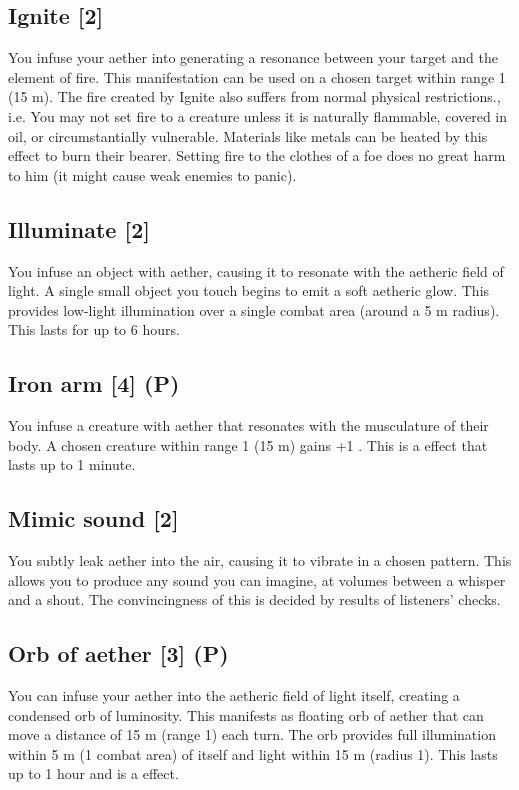 \subsection{Ignite [2]}
\label{spell:ignite}
You infuse your aether into generating a resonance between your target and the element of fire. This manifestation can be used on a chosen target within range 1 (15 m). The fire created by Ignite also suffers from normal physical restrictions., i.e. You may not set fire to a creature unless it is naturally flammable, covered in oil, or circumstantially vulnerable. Materials like metals can be heated by this effect to burn their bearer. Setting fire to the clothes of a foe does no great harm to him (it might cause weak enemies to panic).


\subsection{Illuminate [2]}
\label{spell:illuminate}
You infuse an object with aether, causing it to resonate with the aetheric field of light. A single small object you touch begins to emit a soft aetheric glow. This provides low-light illumination over a single combat area (around a 5 m radius). This lasts for up to 6 hours.


\subsection{Iron arm [4] (P)}
You infuse a creature with aether that resonates with the musculature of their body. A chosen creature within range 1 (15 m) gains +1 . This is a  effect that lasts up to 1 minute.


\subsection{Mimic sound [2]}
You subtly leak aether into the air, causing it to vibrate in a chosen pattern. This allows you to produce any sound you can imagine, at volumes between a whisper and a shout. The convincingness of this is decided by results of listeners'  checks.


\subsection{Orb of aether [3] (P)}
\label{spell:orb-light}
You can infuse your aether into the aetheric field of light itself, creating a condensed orb of luminosity. This manifests as floating orb of aether that can move a distance of 15 m (range 1) each turn. The orb provides full illumination within 5 m (1 combat area) of itself and  light within 15 m (radius 1). This lasts up to 1 hour and is a  effect.


